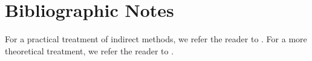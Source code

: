 
\section{Bibliographic Notes}

For a practical treatment of indirect methods, we refer the reader to \cite{bryson1975applied}. For a more theoretical treatment, we refer the reader to \cite{lee1967foundations}.